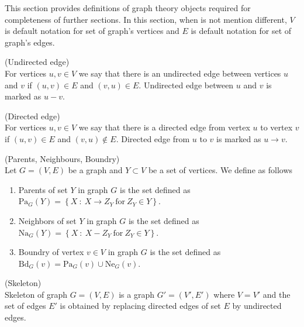%
%


This section provides definitions of graph theory objects required for completeness of further sections.
In this section, when is not mention different, $V$ is default notation for set of graph's vertices and 
$E$ is default notation for set of graph's edges. 


\begin{defi} (Undirected edge) \\
	For vertices $u, v \in V$ we say that there is an undirected edge between vertices $u$ 
	and $v$ if $(u, v) \in E$ and $(v, u) \in E$. Undirected edge between $u$ and $v$ is marked as $u-v$.
\end{defi}


\begin{defi} (Directed edge) \\
	For vertices $u, v \in V$ we say that there is a directed edge from vertex $u$ to vertex $v$ if
	$(u, v) \in E$ and $(v, u) \notin E$. Directed edge from $u$ to $v$ is marked as $u \rightarrow v$.
\end{defi}


\begin{defi} (Parents, Neighbours, Boundry) \\
	Let $G = (V, E)$ be a graph and $Y \subset V$ be a set of vertices. We define as follows
	\begin{enumerate}
		\item Parents of set $Y$ in graph $G$ is the set defined as 
			$\mbox{Pa}_G(Y) = \left\{ X \ : \ X \rightarrow Z_{Y} \ \mbox{for} \ Z_Y \in Y \right\}$.
		
		\item Neighbors of set $Y$ in graph $G$ is the set defined as 
			$\mbox{Na}_G(Y) = \left\{ X \ : \ X - Z_{Y} \ \mbox{for} \ Z_{Y} \in Y \right\}$.

		\item Boundry of vertex $v \in V$ in graph $G$ is the set defined as $\mbox{Bd}_{G}(v) = \mbox{Pa}_G(v) \cup \mbox{Ne}_G(v)$.
	\end{enumerate}
\end{defi}


\begin{defi} (Skeleton) \\
	Skeleton of graph $G = (V, E)$ is a graph $G' = (V', E')$ where $V = V'$ and the set of edges $E'$
	is obtained by replacing directed edges of set $E$ by undirected edges.
\end{defi}


